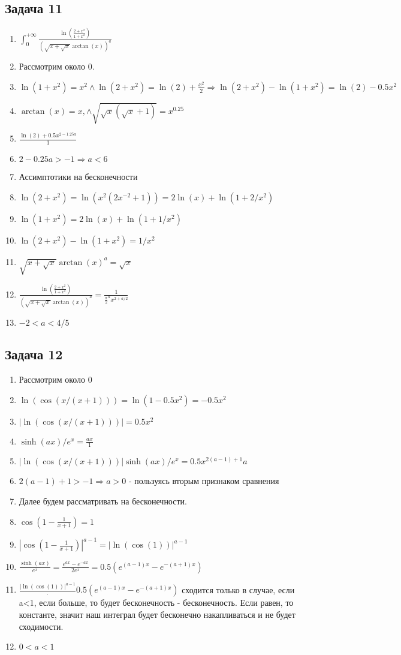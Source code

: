 \documentclass[a4paper,12pt]{article}
\begin{document}
\subsection{Задача 11}
\begin{enumerate}
    \item $\int_{0}^{+\infty} \frac{\ln(\frac{2+x^2}{1+x^2})}{(\sqrt{x+\sqrt{x}}\arctan(x))^a}$
    \item Рассмотрим около 0.
    \item $\ln(1+x^2)=x^2 \land \ln(2+x^2) = \ln(2)+\frac{x^2}{2} \Rightarrow \ln(2+x^2)-\ln(1+x^2)= \ln(2)-0.5x^2$
    \item $\arctan(x)=x, \land \sqrt{\sqrt{x}(\sqrt{x}+1)}=x^{0.25}$
    \item $\frac{\ln(2)+0.5x^{2-1.25a}}{1}$
    \item $2-0.25a > -1 \Rightarrow a < 6$
    \item Ассимптотики на бесконечности
    \item $\ln(2+x^2) = \ln(x^2(2x^{-2}+1)) = 2\ln(x) + \ln(1+2/x^2)$
    \item $\ln(1+x^2) = 2\ln(x) + \ln(1+1/x^2)$
    \item $\ln(2+x^2)-\ln(1+x^2)=1/x^2$
    \item $\sqrt{x+\sqrt{x}}\arctan(x)^a=\sqrt{x}$
    \item $\frac{\ln(\frac{2+x^2}{1+x^2})}{(\sqrt{x+\sqrt{x}}\arctan(x))^a} = \frac{1}{\frac{\pi}{2}^a x^{2+a/2}}$
    \item $-2 < a < 4/5$
\end{enumerate}


\subsection{Задача 12}
\begin{enumerate}
    \item Рассмотрим около 0
    \item $\ln(\cos(x/(x+1))) = \ln(1-0.5x^2) = -0.5x^2$
    \item $|\ln(\cos(x/(x+1)))| = 0.5x^2$
    \item $\sinh(ax)/e^x = \frac{ax}{1}$
    \item $|\ln(\cos(x/(x+1)))|\sinh(ax)/e^x = 0.5x^{2(a-1)+1}a$
    \item $2(a-1)+1>-1 \Rightarrow a>0$ - пользуясь вторым признаком сравнения
    \item Далее будем рассматривать на бесконечности.
    \item $\cos(1-\frac{1}{x+1}) = 1$
    \item $|\cos(1-\frac{1}{x+1})|^{a-1} = |\ln(\cos(1))|^{a-1}$
    \item $\frac{\sinh(ax)}{e^x} = \frac{e^{ax}-e^{-ax}}{2e^x}= 0.5(e^{(a-1)x}-e^{-(a+1)x})$
    \item $\frac{|\ln(\cos(1))|^{a-1}}\cdot  0.5(e^{(a-1)x}-e^{-(a+1)x})$ сходится только в случае, если a<1, если больше, то будет бесконечность - бесконечность. Если равен, то константе, значит наш интеграл будет бесконечно накапливаться и не будет сходимости.
    \item $0 < a < 1$
\end{enumerate}
\end{document}
